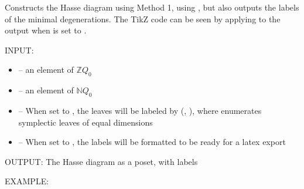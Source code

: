 \documentclass[letterpaper,10pt,english]{sphinxmanual}
\begin{document}
\begin{fulllineitems}
\label{\detokenize{index:quivercombinatorics.quivercombinatorics.Quiver.plot_Hasse_diagram_method_1_labels}}
\pysigstartsignatures
\pysiglinewithargsret
{}
{\sphinxparamcomma {}\sphinxparamcomma {}\sphinxparamcomma {}}
{}
\pysigstopsignatures
\sphinxAtStartPar
Constructs the Hasse diagram using Method 1, using , but also outputs the labels of the minimal degenerations. The TikZ code can be seen by applying  to the output when  is set to .

\sphinxAtStartPar
INPUT:
\begin{itemize}
\item {} 
\sphinxAtStartPar
{} – an element of \(\mathbb{Z}Q_0\)

\item {} 
\sphinxAtStartPar
{} – an element of \(\mathbb{N}Q_0\)

\item {} 
\sphinxAtStartPar
{} – When set to , the leaves will be labeled by (, ), where  enumerates symplectic leaves of equal dimensions

\item {} 
\sphinxAtStartPar
{} – When set to , the labels will be formatted to be ready for a latex export

\end{itemize}

\sphinxAtStartPar
OUTPUT: The Hasse diagram as a poset, with labels

\sphinxAtStartPar
EXAMPLE:


\end{fulllineitems}
\end{document}
